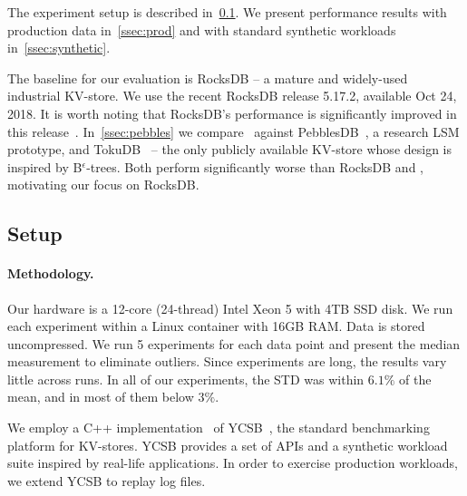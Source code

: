 
The experiment setup is described in~\cref{ssec:setup}. 
We present performance results with production data in~\cref{ssec:prod} and with standard synthetic workloads in~\cref{ssec:synthetic}. 

The baseline for our evaluation is RocksDB -- a mature and widely-used industrial KV-store. 
We use the recent RocksDB release 5.17.2, available Oct 24, 2018.  It is worth noting that RocksDB's performance 
is significantly improved  in this release~\cite{CallaghanCompaction}.   
In~\cref{ssec:pebbles} we compare \sys\ against PebblesDB~\cite{PebblesDB}, a research LSM prototype, and TokuDB~\cite{TokuDB} 
-- the only publicly available KV-store whose design is inspired by B$^\epsilon$-trees. Both  perform significantly worse than RocksDB and \sys, 
motivating our focus on RocksDB.

 
\subsection{Setup}
\label{ssec:setup} 

\paragraph{Methodology.} 
Our hardware is a 12-core (24-thread) Intel Xeon 5  with 4TB SSD disk.  
We run each experiment within a Linux container with 16GB RAM. 
Data is stored uncompressed.
We run 5 experiments for each data point and present the median measurement to eliminate outliers. Since experiments are long, the results vary 
little across runs. In all of our experiments, the STD was within $6.1\%$ of the mean, and in most of them below $3\%$. 

We employ a C++ implementation~\cite{Cpp-YCSB} of YCSB~\cite{YCSB}, the  standard  
benchmarking platform for KV-stores. YCSB provides a set of APIs and a synthetic workload suite inspired 
by real-life applications. In order to exercise production workloads, we extend YCSB to replay log files.
 
